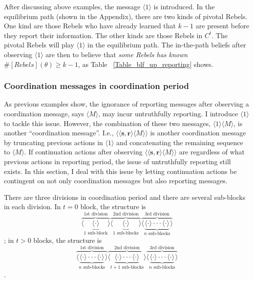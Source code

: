 \documentclass[12pt,letterpaper]{article}
\newtheorem*{main result}{Main Result}
\theoremstyle{definition}
\theoremstyle{remark}
\theoremstyle{claim}
\begin{document}
After discussing above examples, the message $\langle 1 \rangle$ is introduced. In the equilibrium path (shown in the Appendix), there are two kinds of pivotal Rebels. One kind are those Rebels who have already learned that $k-1$ are present before they report their information. The other kinds are those Rebels in $C^t$. The pivotal Rebels will play $\langle 1 \rangle$ in the equilibrium path. The in-the-path beliefs after observing $\langle 1 \rangle$ are then to believe that \textit{some Rebels has known $\#[Rebels](\theta)\geq k-1$}, as Table ~\ref{Table_blf_up_reporting} shows.




\subsubsection*{Coordination messages in coordination period}

As previous examples show, the ignorance of reporting messages after observing a coordination message, says $\langle M \rangle$, may incur untruthfully reporting. I introduce $\langle 1 \rangle$ to tackle this issue. However, the combination of these two messages, $\langle 1 \rangle\langle M \rangle$, is another ``coordination message''. I.e., $\langle\langle \textbf{s}, \textbf{r} \rangle\langle M \rangle\rangle$ is another coordination message by truncating previous actions in $\langle 1 \rangle$ and concatenating the remaining sequence to $\langle M \rangle$. If continuation actions after observing $\langle\langle \textbf{s}, \textbf{r} \rangle\langle M \rangle\rangle$ are regardless of what previous actions in reporting period, the issue of untruthfully reporting still exists. In this section, I deal with this issue by letting continuation actions be contingent on not only coordination messages but also  reporting messages.


There are three divisions in coordination period and there are several sub-blocks in each division. In $t=0$ block, the structure is
\[\overbrace{\langle\underbrace{\langle \cdot \rangle }_{\text{$1$ sub-block}}\rangle}^{\text{1st division}} \overbrace{\langle\underbrace{\langle \cdot \rangle }_{\text{$1$ sub-blocks}} \rangle}^{\text{2nd division}} \overbrace{\langle\underbrace{\langle \cdot \rangle \cdot \cdot \cdot \langle \cdot \rangle}_{\text{$n$ sub-blocks}}\rangle}^{\text{3rd division}}\] 
; in $t>0$ blocks, the structure is
\[\overbrace{\langle\underbrace{\langle \cdot \rangle \cdot \cdot \cdot \langle \cdot \rangle}_{\text{$n$ sub-blocks}}\rangle}^{\text{1st division}} \overbrace{\langle\underbrace{\langle \cdot \rangle \cdot \cdot \cdot \langle \cdot \rangle}_{\text{$t+1$ sub-blocks}} \rangle}^{\text{2nd division}} \overbrace{\langle\underbrace{\langle \cdot \rangle \cdot \cdot \cdot \langle \cdot \rangle}_{\text{$n$ sub-blocks}}\rangle}^{\text{3rd division}}\] 
.
\end{document}
